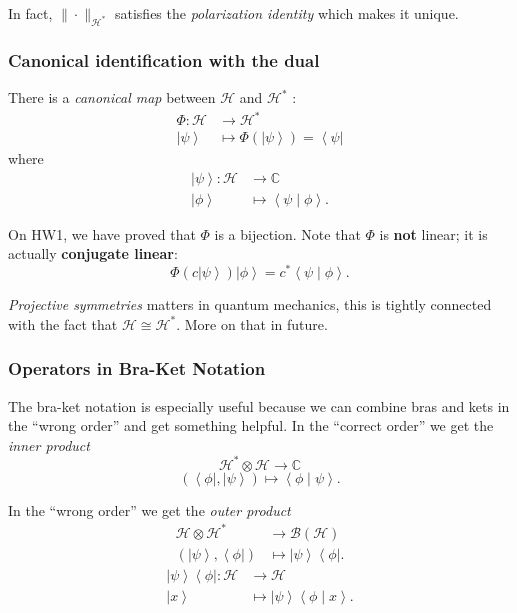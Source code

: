 In fact, $\|\cdot \|_{\mathscr{H}^*}$ satisfies the \textit{polarization identity} which makes it unique.

\subsubsection{Canonical identification with the dual}

There is a \textit{canonical map} between $\mathscr{H}$ and $\mathscr{H}^*$ :
\begin{align*}
	\Phi: \mathscr{H} &\longrightarrow \mathscr{H}^* \\
	\left| \psi \right\rangle  &\longmapsto \Phi(\left| \psi \right\rangle ) = \left\langle \psi \right| 
\end{align*}
where
\begin{align*}
	\left| \psi \right\rangle : \mathscr{H} &\longrightarrow \mathbb{C} \\
	\left| \phi \right\rangle  &\longmapsto \left\langle \psi \middle| \phi \right\rangle 
.\end{align*}

On HW1, we have proved that  $\Phi$ is a bijection. Note that $\Phi$ is \textbf{not} linear; it is actually \textbf{conjugate linear}: 
\[
	\Phi (c \left| \psi \right\rangle ) \left| \phi \right\rangle = c^* \left\langle \psi \middle| \phi \right\rangle 
.\] 

\begin{remark}
	\textit{Projective symmetries} matters in quantum mechanics, this is tightly connected with the fact that $\mathscr{H} \cong \mathscr{H}^*$. More on that in future.
\end{remark}

\subsubsection{Operators in Bra-Ket Notation}

The bra-ket notation is especially useful because we can combine bras and kets in the ``wrong order'' and get something helpful. In the ``correct order'' we get the \textit{inner product}
\[
	\mathscr{H}^* \otimes \mathscr{H} \to  \mathbb{C}
\] 
\[
	\left( \left\langle \phi \right| , \left| \psi \right\rangle  \right)  \mapsto \left\langle \phi \middle| \psi \right\rangle 
.\] 

In the ``wrong order'' we get the \textit{outer product}
\begin{align*}
	\mathscr{H} \otimes  \mathscr{H}^* &\longrightarrow \mathcal{B}(\mathscr{H}) \\
	\left( \left| \psi \right\rangle , \left\langle \phi \right|   \right)  &\longmapsto \left| \psi \right\rangle \left\langle \phi \right| 
.\end{align*}
\begin{align*}
	\left| \psi \right\rangle \left\langle \phi \right| : \mathscr{H} &\longrightarrow \mathscr{H} \\
	\left| x \right\rangle  &\longmapsto \left| \psi \right\rangle \left\langle \phi \middle| x \right\rangle 
.\end{align*}

